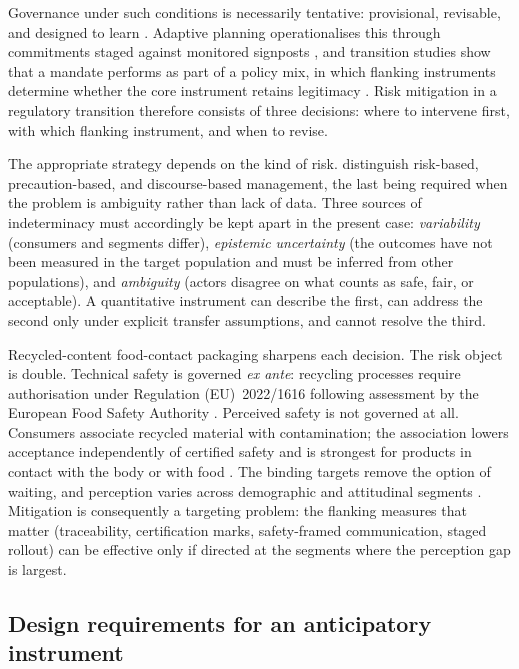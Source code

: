 Governance under such conditions is necessarily tentative: provisional,
revisable, and designed to learn \citep{kuhlmann2019}. Adaptive planning
operationalises this through commitments staged against monitored signposts
\citep{walker2013}, and transition studies show that a mandate performs as part
of a policy mix, in which flanking instruments determine whether the core
instrument retains legitimacy \citep{rogge2016}. Risk mitigation in a
regulatory transition therefore consists of three decisions: where to intervene
first, with which flanking instrument, and when to revise.

The appropriate strategy depends on the kind of risk. \citet{klinke2002}
distinguish risk-based, precaution-based, and discourse-based management, the
last being required when the problem is ambiguity rather than lack of data.
Three sources of indeterminacy must accordingly be kept apart in the present
case: \emph{variability} (consumers and segments differ), \emph{epistemic
uncertainty} (the outcomes have not been measured in the target population and
must be inferred from other populations), and \emph{ambiguity} (actors disagree
on what counts as safe, fair, or acceptable). A quantitative instrument can
describe the first, can address the second only under explicit transfer
assumptions, and cannot resolve the third.

Recycled-content food-contact packaging sharpens each decision. The risk object
is double. Technical safety is governed \emph{ex ante}: recycling processes
require authorisation under Regulation (EU)~2022/1616 following assessment by
the European Food Safety Authority \citep{eu2022}. Perceived safety is not
governed at all. Consumers associate recycled material with contamination; the
association lowers acceptance independently of certified safety and is
strongest for products in contact with the body or with food
\citep{magnier2019,meng2021}. The binding targets remove the option of waiting,
and perception varies across demographic and attitudinal segments
\citep{ruokamo2022,zwicker2020}. Mitigation is consequently a targeting
problem: the flanking measures that matter (traceability, certification marks,
safety-framed communication, staged rollout) can be effective only if directed
at the segments where the perception gap is largest.

\subsection{Design requirements for an anticipatory instrument}
\label{sec:requirements}

